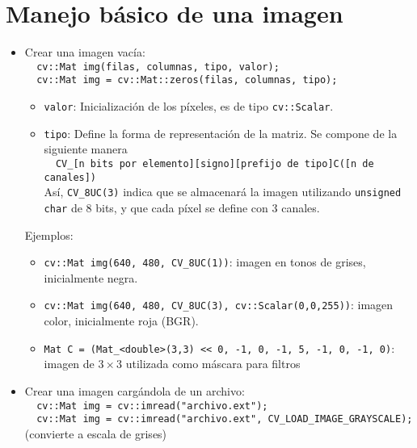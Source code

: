 \documentclass[oneside,a4paper]{book}
\newcommand{\tc}[1]{\texttt{#1}}
\begin{document}
	\section{Manejo básico de una imagen}
\begin{itemize}
		\item Crear una imagen vacía: \\
			\verb|  cv::Mat img(filas, columnas, tipo, valor);|\\
			\verb|  cv::Mat img = cv::Mat::zeros(filas, columnas, tipo);|

			\begin{itemize}
				\item \tc{valor}: Inicialización de los píxeles, es de tipo \tc{cv::Scalar}.
				\item \tc{tipo}: Define la forma de representación de la matriz. Se compone de la siguiente manera\\
					\verb|  CV_[n bits por elemento][signo][prefijo de tipo]C([n de canales])|\\
					Así, \tc{CV\_8UC(3)} indica que se almacenará la imagen utilizando \tc{unsigned char} de 8 bits, y que cada píxel se define con 3 canales.
			\end{itemize}


			Ejemplos:
			\begin{itemize}
				\item \verb|cv::Mat img(640, 480, CV_8UC(1))|: imagen en tonos de grises, inicialmente negra.
				\item \verb|cv::Mat img(640, 480, CV_8UC(3), cv::Scalar(0,0,255))|: imagen color, inicialmente roja (BGR).
				\item \verb|Mat C = (Mat_<double>(3,3) << 0, -1, 0, -1, 5, -1, 0, -1, 0)|: imagen de $3\times3$ utilizada como máscara para filtros
			\end{itemize}

	\item Crear una imagen cargándola de un archivo: \\
		\verb|  cv::Mat img = cv::imread("archivo.ext");|\\
		\verb|  cv::Mat img = cv::imread("archivo.ext", CV_LOAD_IMAGE_GRAYSCALE);| (convierte a escala de grises)


\end{itemize}
\end{document}
